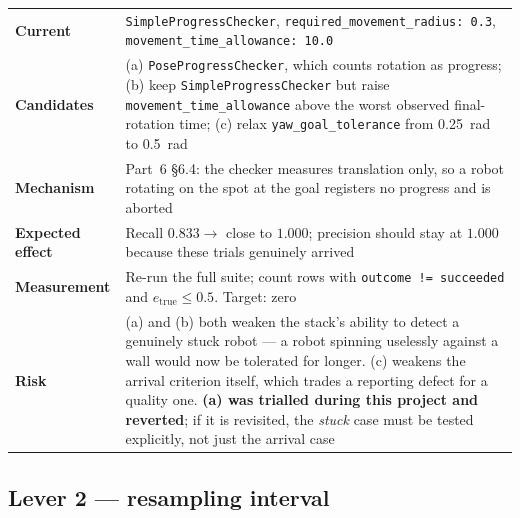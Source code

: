 \documentclass[11pt,a4paper]{report}
\newcommand{\file}[1]{\texttt{\small #1}}
\begin{document}
\begin{center}
\small
\begin{tabular}{@{}p{}p{}@{}}
\toprule
\textbf{Current} & \file{SimpleProgressChecker}, \file{required\_movement\_radius: 0.3},
  \file{movement\_time\_allowance: 10.0} \\
\textbf{Candidates} & (a) \file{PoseProgressChecker}, which counts rotation as
  progress; (b) keep \file{SimpleProgressChecker} but raise
  \file{movement\_time\_allowance} above the worst observed final-rotation time;
  (c) relax \file{yaw\_goal\_tolerance} from \SI{0.25}{\radian} to
  \SI{0.5}{\radian} \\
\textbf{Mechanism} & Part~6 \S6.4: the checker measures translation only, so a
  robot rotating on the spot at the goal registers no progress and is aborted \\
\textbf{Expected effect} & Recall $0.833 \rightarrow$ close to $1.000$;
  precision should stay at $1.000$ because these trials genuinely arrived \\
\textbf{Measurement} & Re-run the full suite; count rows with
  \file{outcome != succeeded} and $e_{\text{true}} \le 0.5$. Target: zero \\
\textbf{Risk} & (a) and (b) both weaken the stack's ability to detect a
  genuinely stuck robot --- a robot spinning uselessly against a wall would now
  be tolerated for longer. (c) weakens the arrival criterion itself, which
  trades a reporting defect for a quality one. \textbf{(a) was trialled during
  this project and reverted}; if it is revisited, the \emph{stuck} case must be
  tested explicitly, not just the arrival case \\
\bottomrule
\end{tabular}
\end{center}

\subsection{Lever 2 --- resampling interval}
\end{document}
